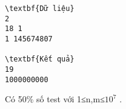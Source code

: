\begin{verbatim}
\textbf{Dữ liệu}
2
18 1
1 145674807	

\textbf{Kết quả}
19
1000000000
\end{verbatim}
Có 50\% số test với 1≤n,m≤$10^{7}$   .
